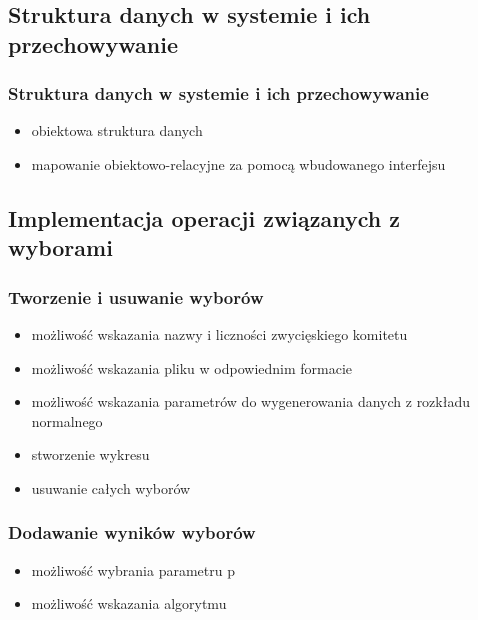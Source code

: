 \documentclass{beamer}
\begin{document}
\subsection{Struktura danych w systemie i ich przechowywanie}

\begin{frame}

\frametitle{Struktura danych w systemie i ich przechowywanie}
\begin{itemize}
\item obiektowa struktura danych
\item mapowanie obiektowo-relacyjne za pomocą wbudowanego interfejsu
\end{itemize}

\end{frame}


\subsection{Implementacja operacji związanych z wyborami}

\begin{frame}

\frametitle{Tworzenie i usuwanie wyborów}
\begin{itemize}
\item możliwość wskazania nazwy i liczności zwycięskiego komitetu
\item możliwość wskazania pliku w odpowiednim formacie
\item możliwość wskazania parametrów do wygenerowania danych z rozkładu normalnego
\item stworzenie wykresu
\item usuwanie całych wyborów 
\end{itemize}

\end{frame}


\begin{frame}

\frametitle{Dodawanie wyników wyborów}
\begin{itemize}
\item możliwość wybrania parametru p
\item możliwość wskazania algorytmu 
\end{itemize}

\end{frame}
\end{document}
